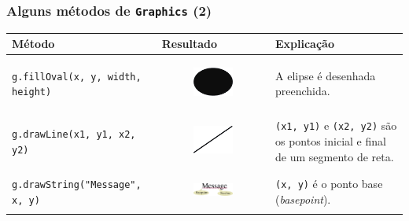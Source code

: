 \documentclass[xcolor={dvipsnames,table},aspectratio=169]{beamer}
\begin{document}
\begin{frame}[fragile]\frametitle{Alguns métodos de \texttt{Graphics} (2)}
{\scriptsize
\begin{center}
  \begin{tabular}{|p{6cm}|p{3cm}|p{4cm}|}
\hline
    \textbf{Método} & \textbf{Resultado} & \textbf{Explicação} \\
\hline
\texttt{g.fillOval(x, y, width, height)}
&
\begin{figure}[h]
	\includegraphics[height=0.1\paperheight,center]{pucrs-ep-fprog-unidade_04-graficos_em_java-laminas-elipse_preenchida.png}
\end{figure}
& A elipse é desenhada preenchida.\\
\hline
\texttt{g.drawLine(x1, y1, x2, y2)}
&
\begin{figure}[h]
	\includegraphics[height=0.1\paperheight,center]{pucrs-ep-fprog-unidade_04-graficos_em_java-laminas-reta.png}
\end{figure}
& \texttt{(x1, y1)} e \texttt{(x2, y2)} são os pontos inicial e final de um segmento de reta.\\
\hline
\texttt{g.drawString("Message", x, y)}
&
\begin{figure}[h]
	\includegraphics[height=0.1\paperheight,center]{pucrs-ep-fprog-unidade_04-graficos_em_java-laminas-message.png}
\end{figure}
	& \texttt{(x, y)} é o ponto base (\emph{basepoint}).\\
\hline
  \end{tabular}
\end{center}
}
\end{frame}
\end{document}
